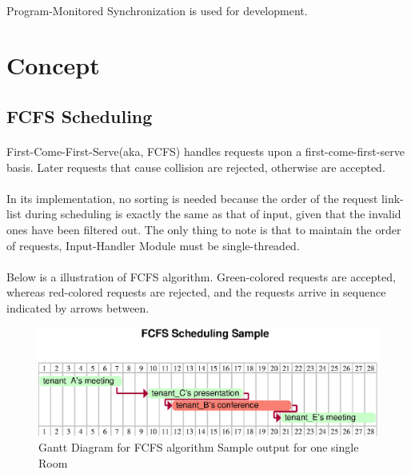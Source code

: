 \documentclass{article}
\begin{document}
            \paragraph{}
            Program-Monitored Synchronization is used for development.
    \cleardoublepage
    \section{Concept}
        \subsection{FCFS Scheduling}
            \paragraph{}
                First-Come-First-Serve(aka, FCFS) handles requests upon a first-come-first-serve basis. Later requests that cause collision are rejected, otherwise are accepted.
            \paragraph{}
                In its implementation, no sorting is needed because the order of the request link-list during scheduling is exactly the same as that of input, given that the invalid ones have been filtered out. The only thing to note is that to maintain the order of requests, Input-Handler Module must be single-threaded.
            \paragraph{}
                Below is a illustration of FCFS algorithm. Green-colored requests are accepted, whereas red-colored requests are rejected, and the requests arrive in sequence indicated by arrows between. 
            \begin{figure}[!htbp]
                \centering
                \includegraphics[scale=0.7]{../res/eps/fcfs_scheduling.eps}
                \caption{Gantt Diagram for FCFS algorithm Sample output for one single Room}
            \end{figure}
\end{document}
